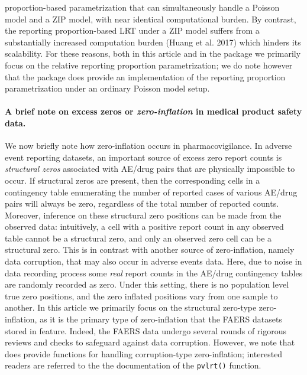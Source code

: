 proportion-based parametrization that can simultaneously handle a Poisson model and a ZIP model, with near identical computational burden. By contrast, the reporting proportion-based LRT under a ZIP model suffers from a substantially increased computation burden (Huang et al. 2017) which hinders its scalability. For these reasons, both in this article and in the  package we primarily focus on the relative reporting proportion parametrization; we do note however that the  package does provide an implementation of the reporting proportion parametrization under an ordinary Poisson model setup.

\hypertarget{a-brief-note-on-excess-zeros-or-zero-inflation-in-medical-product-safety-data.}{%
\paragraph{\texorpdfstring{A brief note on excess zeros or \emph{zero-inflation} in medical product safety data.}{A brief note on excess zeros or zero-inflation in medical product safety data.}}\label{a-brief-note-on-excess-zeros-or-zero-inflation-in-medical-product-safety-data.}}

We now briefly note how zero-inflation occurs in pharmacovigilance. In adverse event reporting datasets, an important source of excess zero report counts is \emph{structural zeros} associated with AE/drug pairs that are physically impossible to occur. If structural zeros are present, then the corresponding cells in a contingency table enumerating the number of reported cases of various AE/drug pairs will always be zero, regardless of the total number of reported counts. Moreover, inference on these structural zero positions can be made from the observed data: intuitively, a cell with a positive report count in any observed table cannot be a structural zero, and only an observed zero cell can be a structural zero. This is in contrast with another source of zero-inflation, namely data corruption, that may also occur in adverse events data. Here, due to noise in data recording process some \emph{real} report counts in the AE/drug contingency tables are randomly recorded as zero. Under this setting, there is no population level true zero positions, and the zero inflated positions vary from one sample to another. In this article we primarily focus on the structural zero-type zero-inflation, as it is the primary type of zero-inflation that the FAERS datasets stored in  feature. Indeed, the FAERS data undergo several rounds of rigorous reviews and checks to safeguard against data corruption. However, we note that  does provide functions for handling corruption-type zero-inflation; interested readers are referred to the the documentation of the \texttt{pvlrt()} function.

